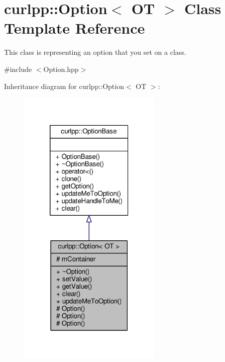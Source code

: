 \hypertarget{classcurlpp_1_1Option}{\section{curlpp\-:\-:Option$<$ O\-T $>$ Class Template Reference}
\label{classcurlpp_1_1Option}
}


This class is representing an option that you set on a class.  




{\ttfamily \#include $<$Option.\-hpp$>$}



Inheritance diagram for curlpp\-:\-:Option$<$ O\-T $>$\-:\nopagebreak
\begin{figure}[H]
\begin{center}
\leavevmode
\includegraphics[width=194pt]{classcurlpp_1_1Option__inherit__graph}
\end{center}
\end{figure}


